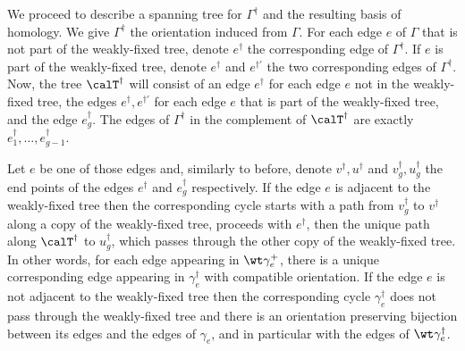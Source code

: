 We proceed to describe a spanning tree for $\Gamma^{\dagger}$ and the resulting basis of homology. We give $\Gamma^{\dagger}$ the orientation induced from $\Gamma$. 
For each edge $e$ of $\Gamma$ that is not part of the weakly-fixed tree, denote $e^{\dagger}$  the corresponding edge of $\Gamma^{\dagger}$. If $e$ is part of the weakly-fixed tree, denote $e^{\dagger}$ and $e^{\dagger'}$ the two corresponding edges of $\Gamma^{\dagger}$. Now, the tree $\calT^{\dagger}$ will consist of an edge $e^{\dagger}$ for each edge $e$ not in the weakly-fixed tree, the edges $e^{\dagger},e^{\dagger'}$ for each edge $e$ that is part of the weakly-fixed tree, and the edge $e_g^{\dagger}$. The edges of $\Gamma^{\dagger}$ in the complement of $\calT^{\dagger}$ are exactly $e_1^{\dagger},\ldots,e_{g-1}^{\dagger}$. 

Let $e$ be one of those edges and, similarly to before, denote $v^{\dagger}, u^{\dagger}$ and $v_g^{\dagger}, u_g^{\dagger}$ the end points of the edges $e^{\dagger}$ and $e_g^{\dagger}$ respectively. 
If the edge $e$ is adjacent to the weakly-fixed tree then the corresponding cycle starts with a path from $v_g^{\dagger}$ to $v^{\dagger}$ along a copy of the weakly-fixed tree, proceeds with $e^{\dagger}$,  then the unique path along $\calT^{\dagger}$ to $u_g^{\dagger}$, which passes through the other copy of the weakly-fixed tree. 
In other words, for each edge appearing in $\wt\gamma_e^+$, there is a unique corresponding edge appearing in $\gamma_e^{\dagger}$ with compatible orientation. If the edge $e$ is not adjacent to the weakly-fixed tree then the corresponding cycle $\gamma_e^{\dagger}$ does not pass through the weakly-fixed tree and there is an orientation preserving bijection between its edges and the edges of $\gamma_e$, and in particular with the edges of $\wt\gamma_e^{\dagger}$. 



 


